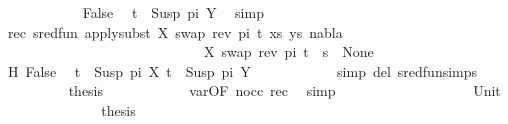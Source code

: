 \begin{isabellebody}
\ \ \ \ \ \ \ \ \ \ \isamarkupfalse%
\ False\ \isamarkupfalse%
\ {\isacartoucheopen}t{}\ {\isacharequal}{\kern0pt}\ Susp\ pi{}\ Y{\isacartoucheclose}\ \isamarkupfalse%
\ simp\isanewline
\ \ \ \ \ \ \ \ \isamarkupfalse%
\ rec{\isacharcolon}{\kern0pt}\ {\isachardoublequoteopen}sred{\isacharunderscore}{\kern0pt}fun\ {\isacharparenleft}{\kern0pt}apply{\isacharunderscore}{\kern0pt}subst\ {\isacharbrackleft}{\kern0pt}{\isacharparenleft}{\kern0pt}X{\isacharcomma}{\kern0pt}\ swap\ {\isacharparenleft}{\kern0pt}rev\ pi{\isacharparenright}{\kern0pt}\ t{}{\isacharparenright}{\kern0pt}{\isacharbrackright}{\kern0pt}\ {\isacharparenleft}{\kern0pt}xs{\isacharcomma}{\kern0pt}\ ys{\isacharparenright}{\kern0pt}{\isacharcomma}{\kern0pt}\ nabla{\isacharcomma}{\kern0pt}\isanewline
\ \ \ \ \ \ \ \ \ \ \ \ \ \ \ \ \ \ \ \ \ \ \ \ \ \ \ \ \ {\isacharbrackleft}{\kern0pt}{\isacharparenleft}{\kern0pt}X{\isacharcomma}{\kern0pt}\ swap\ {\isacharparenleft}{\kern0pt}rev\ pi{\isacharparenright}{\kern0pt}\ t{}{\isacharparenright}{\kern0pt}{\isacharbrackright}{\kern0pt}\ {\isasymbullet}\ s{\isacharparenright}{\kern0pt}\ {\isacharequal}{\kern0pt}\ None{\isachardoublequoteclose}\isanewline
\ \ \ \ \ \ \ \ \ \ \isamarkupfalse%
\ H\ False\ \isamarkupfalse%
\ {\isacartoucheopen}t{}\ {\isacharequal}{\kern0pt}\ Susp\ pi\ X{\isacartoucheclose}\ {\isacartoucheopen}t{}\ {\isacharequal}{\kern0pt}\ Susp\ pi{}\ Y{\isacartoucheclose}\isanewline
\ \ \ \ \ \ \ \ \ \ \isamarkupfalse%
\ {\isacharparenleft}{\kern0pt}simp\ del{\isacharcolon}{\kern0pt}\ sred{\isacharunderscore}{\kern0pt}fun{\isachardot}{\kern0pt}simps{\isacharparenright}{\kern0pt}\isanewline
\ \ \ \ \ \ \ \ \isamarkupfalse%
\ {\isacharquery}{\kern0pt}thesis\isanewline
\ \ \ \ \ \ \ \ \ \ \isamarkupfalse%
\ var{\isacharunderscore}{\kern0pt}{}{\isacharbrackleft}{\kern0pt}OF\ nocc\ rec{\isacharbrackright}{\kern0pt}\ \isamarkupfalse%
\ simp\isanewline
\ \ \ \ \ \ \isamarkupfalse%
\isanewline
\ \ \ \ \isamarkupfalse%
\isanewline
\ \ \ \ \ \ \isamarkupfalse%
\ Unit\isanewline
\ \ \ \ \ \ %
\isanewline
\ \ \ \ \ \ \isamarkupfalse%
\ {\isacharquery}{\kern0pt}thesis\isanewline

\end{isabellebody}
